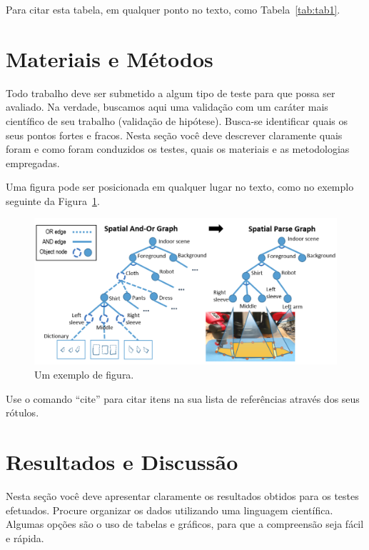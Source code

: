 \documentclass[twoside,conference,a4paper]{IEEEtran}
\begin{document}
Para citar esta tabela, em qualquer ponto no texto, como Tabela~\ref{tab:tab1}.


\section{Materiais e Métodos}

Todo trabalho deve ser submetido a algum tipo de teste para que possa ser avaliado. Na verdade, buscamos aqui uma validação com um caráter mais científico de seu trabalho (validação de hipótese). Busca-se identificar quais os seus pontos fortes e fracos. Nesta seção você deve descrever claramente quais foram e como foram conduzidos os testes, quais os materiais e as metodologias empregadas.   

Uma figura pode ser posicionada em qualquer lugar no texto, como no exemplo seguinte da Figura~\ref{fig:fig1}.

\begin{figure}[ht]
\centering
\includegraphics[width=1\hsize]{figuras/pipeline.png}
\caption{Um exemplo de figura.}
\label{fig:fig1}
\end{figure}

Use o comando ``cite'' para citar itens na sua lista de
referências através dos seus rótulos.


\section{Resultados e Discussão}

Nesta seção você deve apresentar claramente os resultados obtidos para os testes efetuados. Procure organizar os dados utilizando uma linguagem científica. Algumas opções são o uso de tabelas e gráficos, para que a compreensão seja fácil e rápida. 
\end{document}
